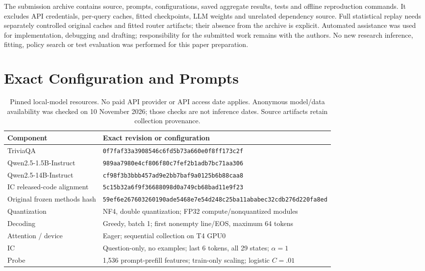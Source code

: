 \documentclass[11pt]{article}
\begin{document}
The submission archive contains source, prompts, configurations, saved aggregate results, tests and offline reproduction commands. It excludes API credentials, per-query caches, fitted checkpoints, LLM weights and unrelated dependency source. Full statistical replay needs separately controlled original caches and fitted router artifacts; their absence from the archive is explicit. Automated assistance was used for implementation, debugging and drafting; responsibility for the submitted work remains with the authors. No new research inference, fitting, policy search or test evaluation was performed for this paper preparation.

\label{sec:mainend}
\clearpage

\clearpage
\appendix

\section{Exact Configuration and Prompts}
\label{app:config}
\begin{table}[t]
\centering\small
\begin{tabular}{ll}
\toprule
Component & Exact revision or configuration \\
\midrule
TriviaQA & \texttt{0f7faf33a3908546c6fd5b73a660e0f8ff173c2f} \\
Qwen2.5-1.5B-Instruct & \texttt{989aa7980e4cf806f80c7fef2b1adb7bc71aa306} \\
Qwen2.5-14B-Instruct & \texttt{cf98f3b3bbb457ad9e2bb7baf9a0125b6b88caa8} \\
IC released-code alignment & \texttt{5c15b32a6f9f36688098d0a749cb68bad11e9f23} \\
Original frozen methods hash & \texttt{59ef6e267603260190ade5468e7e54d248c25ba11ababec32cdb276d220fa8ed} \\
Quantization & NF4, double quantization; FP32 compute/nonquantized modules \\
Decoding & Greedy, batch 1; first nonempty line/EOS, maximum 64 tokens \\
Attention / device & Eager; sequential collection on T4 GPU0 \\
IC & Question-only, no examples; last 6 tokens, all 29 states; $\alpha=1$ \\
Probe & 1,536 prompt-prefill features; train-only scaling; logistic $C=.01$ \\
\bottomrule
\end{tabular}
\caption{Pinned local-model resources. No paid API provider or API access date applies. Anonymous model/data availability was checked on 10 November 2026; those checks are not inference dates. Source artifacts retain collection provenance.}
\label{tab:config}
\end{table}
\end{document}
